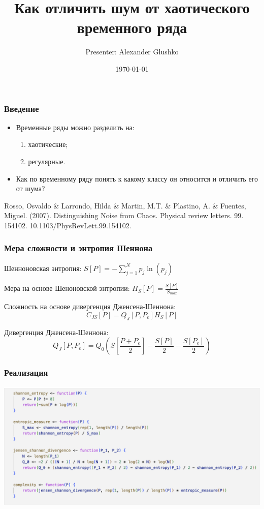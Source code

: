 \documentclass[aspectratio=169]{beamer}
\title[Title]{Как отличить шум от хаотического временного ряда}
\author[Author's name]{Presenter: Alexander Glushko}
\institute{Master's Programme Data Science}
\date{\today}
\begin{document}
\frame[plain]{\titlepage}

\begin{frame}
  \frametitle{Введение}
  \begin{itemize}
    \item Временные ряды можно разделить на:
    \begin{enumerate}
      \item хаотические;
      \item регулярные.
    \end{enumerate}
    \item Как по временному ряду понять к какому классу он относится и отличить его от шума?
  \end{itemize}
  \bigskip
  Rosso, Osvaldo \& Larrondo, Hilda \& Martin, M.T. \& Plastino, A. \& Fuentes, Miguel. (2007). Distinguishing Noise from Chaos. Physical review letters. 99. 154102. 10.1103/PhysRevLett.99.154102.
\end{frame}

\begin{frame}
  \frametitle{Мера сложности и энтропия Шеннона}
  \medskip

  Шенноновская энтропия: $S[P] = - \sum\limits^N_{j=1}p_j\ln(p_j)$
  
  \medskip 

  Мера на основе Шеноновской энтропии: $H_S[P] = \frac{S[P]}{S_{max}}$
  
  \bigskip 

  Сложность на основе дивергенция Дженсена-Шеннона: $$C_{JS}[P] = Q_J[P, P_e]H_S[P]$$
  
  \medskip

  Дивергенция Дженсена-Шеннона: $$Q_J[P, P_e] = Q_0 (S\left[ \frac{P + P_e}{2} \right] - \frac{S[P]}{2} - \frac{S[P_e]}{2})$$ 
\end{frame}

\begin{frame}
  \frametitle{Реализация}
  \medskip
  \begin{center}
    \includegraphics[width=0.85\columnwidth]{EntropyFunction.png}
  \end{center}
\end{frame}
\end{document}
